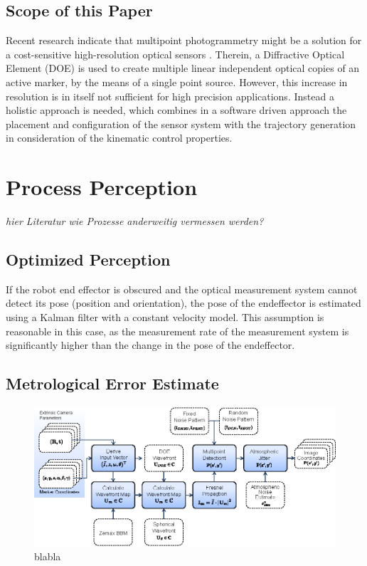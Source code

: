 \documentclass[5p,times,procedia]{elsarticle}
\begin{document}
\subsection{Scope of this Paper}
Recent research indicate that multipoint photogrammetry might be a solution for a cost-sensitive high-resolution optical sensors \cite{Hartlieb_2021}. Therein, a Diffractive Optical Element (DOE) is used to create multiple linear independent optical copies of an active marker, by the means of a single point source. However, this increase in
resolution is in itself not sufficient for high precision applications. Instead a holistic approach is needed, which combines in a software driven approach the placement and configuration of the sensor system with the trajectory generation in consideration of the kinematic control properties.


\section{Process Perception}
\textit{hier Literatur wie Prozesse anderweitig vermessen werden?}

\subsection{Optimized Perception}

If the robot end effector is obscured and the optical measurement system cannot detect its pose (position and orientation), the pose of the endeffector is estimated using a Kalman filter with a constant velocity model. This assumption is reasonable in this case, as the measurement rate of the measurement system is significantly higher than the change in the pose of the endeffector.

\subsection{Metrological Error Estimate}
\label{error_estimate}

\cite{Di_Leo_2011}
\cite{Liu_2021}

\begin{figure}[h]
	\centering
	\includegraphics[width=\columnwidth]{graphics/OpticalSimulation.eps}
	\caption{blabla}
\end{figure}
\end{document}
